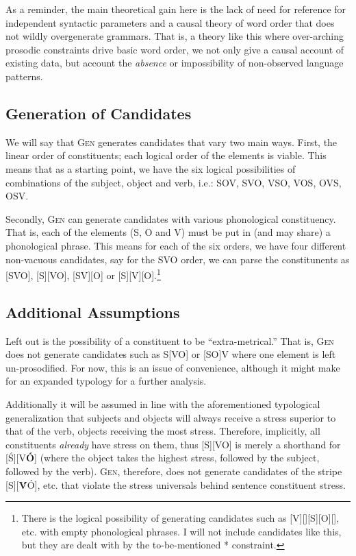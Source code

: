 \documentclass{article}
\newcommand{\nophi}{\textsc{*\textphi}}
\begin{document}
As a reminder, the main theoretical gain here is the lack of need for reference for independent syntactic parameters and a causal theory of word order that does not wildly overgenerate grammars.
That is, a theory like this where over-arching prosodic constraints drive basic word order, we not only give a causal account of existing data, but account the \emph{absence} or impossibility of non-observed language patterns.

\subsection{Generation of Candidates\label{generation}}

We will say that \textsc{Gen} generates candidates that vary two main ways.
First, the linear order of constituents; each logical order of the elements is viable.
This means that as a starting point, we have the six logical possibilities of combinations of the subject, object and verb, i.e.: SOV, SVO, VSO, VOS, OVS, OSV.

Secondly, \textsc{Gen} can generate candidates with various phonological constituency.
That is, each of the elements (S, O and V) must be put in (and may share) a phonological phrase.
This means for each of the six orders, we have four different non-vacuous candidates, say for the SVO order, we can parse the constitunents as [SVO], [S][VO], [SV][O] or [S][V][O].\footnote{There is the logical possibility of generating candidates such as [V][][S][O][], etc. with empty phonological phrases. I will not include candidates like this, but they are dealt with by the to-be-mentioned {\nophi} constraint.}

\subsection{Additional Assumptions\label{assump}}

Left out is the possibility of a constituent to be ``extra-metrical.''
That is, \textsc{Gen} does not generate candidates such as S[VO] or [SO]V where one element is left un-prosodified.
For now, this is an issue of convenience, although it might make for an expanded typology for a further analysis.

Additionally it will be assumed in line with the aforementioned typological generalization that subjects and objects will always receive a stress superior to that of the verb, objects receiving the most stress.
Therefore, implicitly, all constituents \emph{already} have stress on them, thus [S][VO] is merely a shorthand for [{\'S}][V\textbf{\'O}] (where the object takes the highest stress, followed by the subject, followed by the verb).
\textsc{Gen}, therefore, does not generate candidates of the stripe [S][\textbf{\'V}\'O], etc. that violate the stress universals behind sentence constituent stress.
\end{document}
